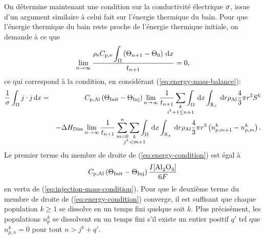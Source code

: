 On détermine maintenant une condition sur la conductivité électrique
$\sigma$, issue d'un argument similaire à celui fait sur
l'énergie thermique du bain. Pour que l'énergie thermique du bain
reste proche de l'énergie thermique initiale, on demande à ce que
\begin{equation}
  \lim_{n\to\infty}\frac{\rho_\mathrm{e}C_{\mathrm{p,e}}\displaystyle\int_\Omega\left( \Theta_{n+1}
    - \Theta_0 \right)\,\mathrm dx}{t_{n+1}} = 0,
\end{equation}
ce qui correspond à la condition, en considérant (\ref{eq:energy-mass-balance}):
\begin{eqnarray}
  \frac{1}{\conductivity} \int_\Omega j\cdot j\intd{x} &=&
  \aluminahc\parent{\tinit - \tinj}\lim_{n\to\infty}\frac{1}{t_{n+1}}\sum_{\mathclap{\substack{k\\ i^k +
  1 \leq n + 1}}}\int_\Omega\intd{x}\int_\rplus\intd{r}\aluminadensity
  \frac{4}{3}\pi r^3 S^k\nonumber \\
  &&-
       {\aluminadissolutionenthalpy}\lim_{n\to\infty}\frac{1}{t_{n+1}}\sum_{m = 0}^{n}\sum_{\mathclap{\substack{k\\ j^k < m + 1}}} \int_\Omega\intd{x}\int_\rplus\intd{r} \aluminadensity \frac{4}{3}\pi r^3\parent{n_{p,m+1}^k-n_{p,m}^k}.\nonumber\\
       \label{eq:energy-condition}
\end{eqnarray}
Le premier terme du membre de droite de (\ref{eq:energy-condition})
est égal à
\begin{equation*}
  \aluminahc\parent{\tinit-\tinj}  \frac{I[\cee{Al2O3}]}{6F}
\end{equation*}
en vertu de (\ref{eq:injection-mass-condition}). Pour que le deuxième
terme du membre de droite de (\ref{eq:energy-condition}) converge, il
est suffisant que chaque population $k\geq 1$ se dissolve en un temps
fini quelque soit $k$. Plus précisément, les populations $n_p^k$
se dissolvent en un temps fini s'il existe un entier positif $q'$ tel
que $n_{p,n}^k = 0$ pour tout $n > j^k + q'$.

